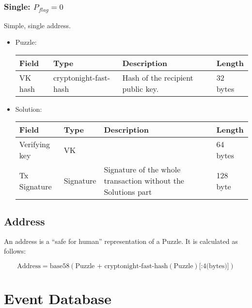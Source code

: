 \documentclass[a4paper,10pt]{article}
\begin{document}
            \subsubsection{Single: $P_{flag} = 0$}
                Simple, single address.
                \begin{itemize}
                 \item Puzzle:\\
                    
                    \begin{tabularx}{\textwidth}{|l|l|X|l|}
                        \hline Field & Type & Description & Length \\ \hline
                        \hline VK hash & cryptonight-fast-hash & Hash of the recipient public key. & 32 bytes \\
                        \hline
                    \end{tabularx}
                 \item Solution:\\
                 
                    \begin{tabularx}{\textwidth}{|l|l|X|l|}
                        \hline Field & Type & Description & Length \\ \hline
                        \hline Verifying key & VK &  & 64 bytes \\
                        \hline Tx Signature & Signature & Signature of the whole transaction without the Solutions part & 128 byte \\
                        \hline
                    \end{tabularx}
                \end{itemize}
        
        \subsection{Address}
            An address is a ``safe for human'' representation of a Puzzle.
            It is calculated as follows:
            
            $$\text{Address} = \text{base58}(\text{Puzzle + cryptonight-fast-hash}(\text{Puzzle})\text{[:4(bytes)]})$$

                
    \section{Event Database}
\end{document}
